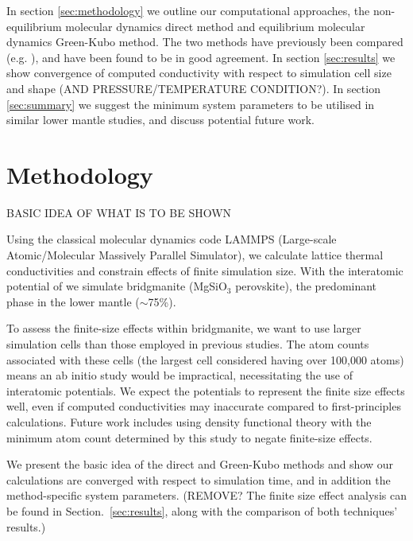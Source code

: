 \documentclass[%
preprint,                                  %
nofootinbib,
 amsmath,amssymb,
 aps,
]{revtex4-1}
\begin{document}

In section \ref{sec:methodology} we outline our computational approaches, the non-equilibrium molecular dynamics direct method and equilibrium molecular dynamics Green-Kubo method. The two methods have previously been compared (e.g. \citet{Schelling2002}), and have been found to be in good agreement. In section \ref{sec:results} we show convergence of computed conductivity with respect to simulation cell size and shape (AND PRESSURE/TEMPERATURE CONDITION?). In section \ref{sec:summary} we suggest the minimum system parameters to be utilised in similar lower mantle studies, and discuss potential future work.















\section{\label{sec:methodology}Methodology}

BASIC IDEA OF WHAT IS TO BE SHOWN

Using the classical molecular dynamics code LAMMPS\cite{Plimpton1995} (Large-scale Atomic/Molecular Massively Parallel Simulator), we calculate lattice thermal conductivities and constrain effects of finite simulation size. With the interatomic potential of \citet{Oganov2000} we simulate bridgmanite (MgSiO$_3$ perovskite), the predominant phase in the lower mantle ($\sim$75\%). 

To assess the finite-size effects within bridgmanite, we want to use larger simulation cells than those employed in previous studies. The atom counts associated with these cells (the largest cell considered having over 100,000 atoms) means an ab initio study would be impractical, necessitating the use of interatomic potentials. We expect the potentials to represent the finite size effects well, even if computed conductivities may inaccurate compared to first-principles calculations. Future work includes using density functional theory with the minimum atom count determined by this study to negate finite-size effects.  

We present the basic idea of the direct and Green-Kubo methods and show our calculations are converged with respect to simulation time, and in addition the method-specific system parameters. (REMOVE? The finite size effect analysis can be found in Section.~\ref{sec:results}, along with the comparison of both techniques' results.)
\end{document}

